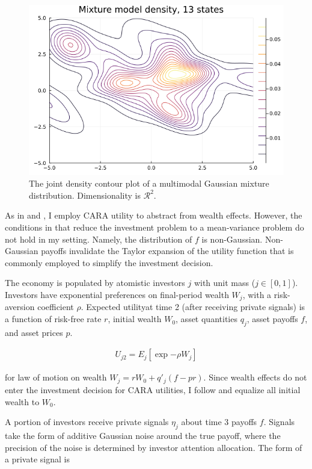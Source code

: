 \documentclass{article}
\begin{document}
\begin{figure}
    \includegraphics[width=\textwidth,height=\textheight,keepaspectratio]{plots/mixture-1.png}
    \caption{The joint density contour plot of a multimodal Gaussian mixture distribution. Dimensionality is $\mathcal{R}^2$.}
\end{figure}

As in \textcite{admati_noisy_1985} and \textcite{kacperczyk_rational_2016}, I employ CARA utility to abstract from wealth effects. However, the conditions in \textcite{kacperczyk_rational_2016} that reduce the investment problem to a mean-variance problem do not hold in my setting. Namely, the distribution of $f$ is non-Gaussian. Non-Gaussian payoffs invalidate the Taylor expansion of the utility function that is commonly employed to simplify the investment decision.

The economy is populated by atomistic investors $j$ with unit mass ($j \in [0, 1]$). Investors have exponential preferences on final-period wealth $W_j$, with a risk-aversion coefficient $\rho$. Expected utilityat time 2 (after receiving private signals) is a function of risk-free rate $r$, initial wealth $W_0$, asset quantities $q_j$, asset payoffs $f$, and asset prices $p$.

\begin{align}
    U_{j2} = E_j[\exp{-\rho W_j}]
\end{align}

\noindent for law of motion on wealth $W_j = r W_0 + q'_j (f - pr)$. Since wealth effects do not enter the investment decision for CARA utilities, I follow  \textcite{kacperczyk_rational_2016} and equalize all initial wealth to $W_0$.

A portion of investors receive private signals $\eta_j$ about time 3 payoffs $f$. Signals take the form of additive Gaussian noise around the true payoff, where the precision of the noise is determined by investor attention allocation. The form of a private signal is
\end{document}
